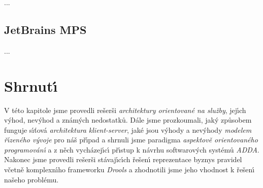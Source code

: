 ...

\subsection{JetBrains MPS}


...

\section{Shrnut\'{\i}}

V této kapitole jsme provedli rešerši \textit{architektury orientované
na služby}, jej\'{\i}ch v\'yhod, nev\'yhod a znám\'ych nedostatků. Dále jsme
prozkoumali, jak\'y způsobem funguje s\'{\i}ťová \textit{architektura klient-server},
jaké jsou v\'yhody a nev\'yhody \textit{modelem ř\'{\i}zeného v\'yvoje} pro náš př\'{\i}pad
a shrnuli jsme paradigma \textit{aspektově orientovaného programován\'{\i}} a
z něch vycházej\'{\i}c\'{\i} př\'{\i}stup k návrhu softwarov\'ych systémů \textit{ADDA}.
Nakonec jsme provedli rešerši stávaj\'{\i}c\'{\i}ch řešen\'{\i} reprezentace byznys pravidel
včetně komplexn\'{\i}ho frameworku \textit{Drools} a zhodnotili jsme jeho vhodnost
k řešen\'{\i} našeho problému.
